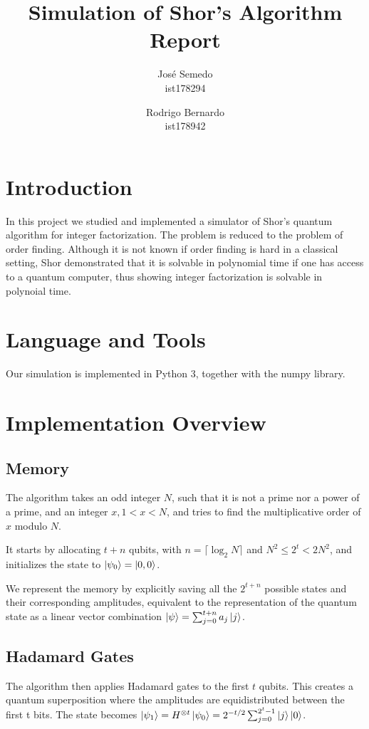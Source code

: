 \documentclass{article}
\title{Simulation of Shor's Algorithm Report}
\author{
  José Semedo\\
  ist178294
  \and
  Rodrigo Bernardo\\
  ist178942
}
\date{}
\begin{document}
\maketitle

\section{Introduction}
In this project we studied and implemented a simulator of Shor's quantum
algorithm for integer factorization. The problem is reduced to the problem of
order finding. Although it is not known if order finding is hard in a classical
setting, Shor \cite{Shor} demonstrated that it is solvable in polynomial time if
one has access to a quantum computer, thus showing integer factorization is
solvable in polynoial time.


\section{Language and Tools}
Our simulation is implemented in Python 3, together with the numpy library.


\section{Implementation Overview}

\subsection{Memory}
The algorithm takes an odd integer $N$, such that it is not a prime nor a power
of a prime, and an integer $x, 1 < x < N$, and tries to find the multiplicative
order of $x$ modulo $N$.

It starts by allocating $t + n$ qubits, with $n = \lceil{\log_2 N}\rceil$ and
$N^2 \leq 2^t < 2N^2$, and initializes the state to $\ket{\psi_{0}} = \ket{0,
0}$.

We represent the memory by explicitly saving all the $2^{t+n}$ possible states and
their corresponding amplitudes, equivalent to the representation of the quantum
state as a linear vector combination $\ket{\psi} =
\sum_{j=0}^{t+n}a_{j}\ket{j}$.

\subsection{Hadamard Gates}
The algorithm then applies Hadamard gates to the first $t$ qubits. This creates
a quantum superposition where the amplitudes are equidistributed between the
first t bits. The state becomes $\ket{\psi_1} = H^{\otimes{t}}\ket{\psi_0} =
2^{-t/2}\sum_{j=0}^{2^t-1}\ket{j}\ket{0}$.
\end{document}
